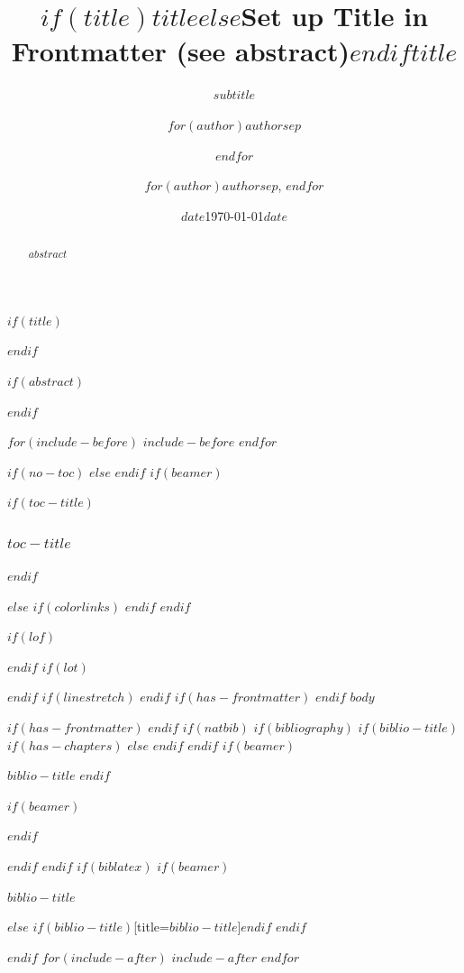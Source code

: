 \documentclass[
$if(fontsize)$
  $fontsize$,
$endif$
$if(papersize)$
  $papersize$paper,
$else$
  paper=a4,
$endif$
$if(beamer)$
  ignorenonframetext,
$if(handout)$
  handout,
$endif$
$if(aspectratio)$
  aspectratio=$aspectratio$,
$endif$
$endif$
$for(classoption)$
  $classoption$$sep$,
$endfor$
  ,captions=tableheading
]{$if(beamer)$$documentclass$$else$$if(book)$scrbook$else$scrartcl$endif$$endif$}
\title{$if(title)$$title$$else$Set up Title in Frontmatter (see abstract)$endif$}
\subtitle{$subtitle$}
\author{$for(author)$$author$$sep$ \and $endfor$}
\date{$date$}
\date{\today}
\institute{$for(institute)$$institute$$sep$ \and $endfor$}
\title{$title$}
\author{$for(author)$$author$$sep$, $endfor$}
\date{$date$}
\newif\ifbibliography
\begin{document}
$if(title)$
\maketitle
$endif$

$if(abstract)$
\begin{abstract}
$abstract$
\end{abstract}
\newpage
$endif$

$for(include-before)$
$include-before$
$endfor$

$if(no-toc)$
$else$
\renewcommand*\contentsname{$toc-title$}
\renewcommand*\contentsname{Table of Contents}
$endif$
$if(beamer)$
\begin{frame}[allowframebreaks]
$if(toc-title)$
  \frametitle{$toc-title$}
$endif$
  \tableofcontents[hideallsubsections]
\end{frame}
\newpage
$else$
{
$if(colorlinks)$
\hypersetup{linkcolor=$if(toccolor)$$toccolor$$else$$endif$}
$endif$
\setcounter{tocdepth}{$toc-depth$}
\tableofcontents
\newpage
}
$endif$

$if(lof)$
\listoffigures
$endif$
$if(lot)$
\listoftables
$endif$
$if(linestretch)$
$endif$
$if(has-frontmatter)$
\mainmatter
$endif$
$body$

$if(has-frontmatter)$
\backmatter
$endif$
$if(natbib)$
$if(bibliography)$
$if(biblio-title)$
$if(has-chapters)$
\renewcommand\bibname{$biblio-title$}
$else$
\renewcommand\refname{$biblio-title$}
$endif$
$endif$
$if(beamer)$
\begin{frame}[allowframebreaks]{$biblio-title$}
  \bibliographytrue
$endif$
  
$if(beamer)$
\end{frame}
$endif$

$endif$
$endif$
$if(biblatex)$
$if(beamer)$
\begin{frame}[allowframebreaks]{$biblio-title$}
  \bibliographytrue
  \printbibliography[heading=none]
\end{frame}
$else$
\printbibliography$if(biblio-title)$[title=$biblio-title$]$endif$
$endif$

$endif$
$for(include-after)$
$include-after$
$endfor$
\end{document}
